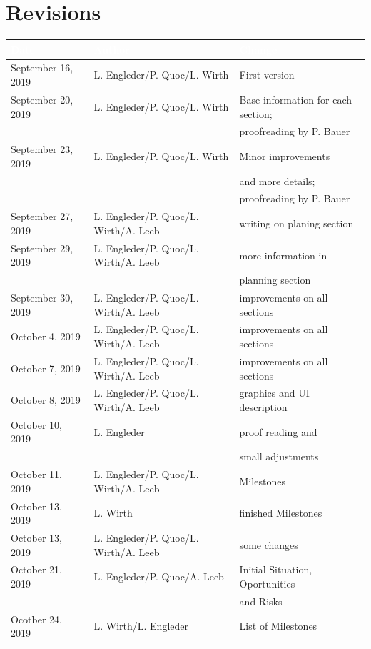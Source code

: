\documentclass[12pt]{article}
\theoremstyle{definition}
\begin{document}
\section*{Revisions}
\begin{tabular}{|l|l|l|}
\hline
\cellcolor[gray]{0.5}\textcolor{white}{Date} & \cellcolor[gray]{0.5}\textcolor{white}{Author} & \cellcolor[gray]{0.5}\textcolor{white}{Change} \\ \hline
September 16, 2019&L. Engleder/P. Quoc/L. Wirth&First version \\ \hline
September 20, 2019&L. Engleder/P. Quoc/L. Wirth& Base information for each section; \\ && proofreading by P. Bauer \\ \hline
September 23, 2019&L. Engleder/P. Quoc/L. Wirth&Minor improvements \\ && and more details;  \\ && proofreading by P. Bauer \\ \hline
September 27, 2019&L. Engleder/P. Quoc/L. Wirth/A. Leeb&writing on planing section \\ \hline
September 29, 2019&L. Engleder/P. Quoc/L. Wirth/A. Leeb&more information in \\ && planning section \\ \hline
September 30, 2019&L. Engleder/P. Quoc/L. Wirth/A. Leeb& improvements on all sections \\ \hline
October 4, 2019&L. Engleder/P. Quoc/L. Wirth/A. Leeb&improvements on all sections\\ \hline
October 7, 2019&L. Engleder/P. Quoc/L. Wirth/A. Leeb&improvements on all sections\\ \hline
October 8, 2019&L. Engleder/P. Quoc/L. Wirth/A. Leeb&graphics and UI description\\ \hline
October 10, 2019&L. Engleder&proof reading and \\ && small adjustments\\ \hline
October 11, 2019&L. Engleder/P. Quoc/L. Wirth/A. Leeb&Milestones\\ \hline
October 13, 2019&L. Wirth&finished Milestones\\ \hline
October 13, 2019&L. Engleder/P. Quoc/L. Wirth/A. Leeb&some changes\\ \hline
October 21, 2019&L. Engleder/P. Quoc/A. Leeb&Initial Situation, Oportunities \\ && and Risks \\ \hline
Ocotber 24, 2019&L. Wirth/L. Engleder&List of Milestones \\ \hline
\end{tabular}
\pagebreak
 
\end{document}
